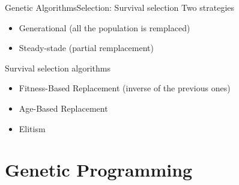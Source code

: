 \documentclass[10pt,compress]{beamer} %
\begin{document}
\begin{frame}{Genetic Algorithms}{Selection: Survival selection}
	Two strategies
	\begin{itemize}
		\item Generational (all the population is remplaced)
		\item Steady-stade (partial remplacement)
	\end{itemize}
	Survival selection algorithms
	\begin{itemize}
		\item Fitness-Based Replacement (inverse of the previous ones)
		\item Age-Based Replacement
		\item Elitism
  	\end{itemize}
\end{frame}

\section{Genetic Programming}
\end{document}
